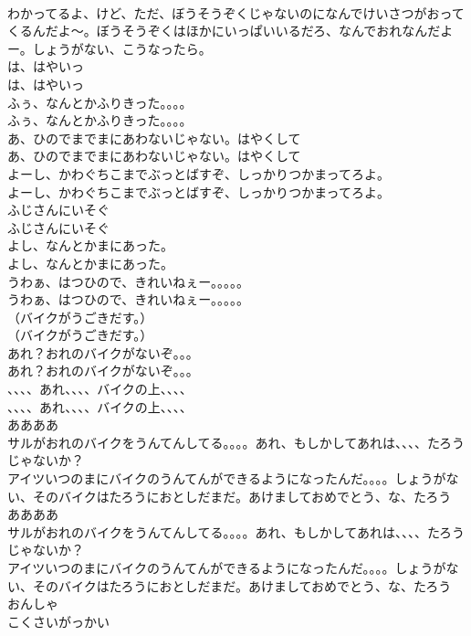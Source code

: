 \documentclass[8pt]{extreport}
\begin{document}
\begin{CJK}{UTF8}{min}
\\	わかってるよ、けど、ただ、ぼうそうぞくじゃないのになんでけいさつがおってくるんだよ〜。ぼうそうぞくはほかにいっぱいいるだろ、なんでおれなんだよー。しょうがない、こうなったら。
\\	は、はやいっ
\\	は、はやいっ
\\	ふぅ、なんとかふりきった。。。。
\\	ふぅ、なんとかふりきった。。。。
\\	あ、ひのでまでまにあわないじゃない。はやくして
\\	あ、ひのでまでまにあわないじゃない。はやくして
\\	よーし、かわぐちこまでぶっとばすぞ、しっかりつかまってろよ。
\\	よーし、かわぐちこまでぶっとばすぞ、しっかりつかまってろよ。
\\	ふじさんにいそぐ
\\	ふじさんにいそぐ
\\	よし、なんとかまにあった。
\\	よし、なんとかまにあった。
\\	うわぁ、はつひので、きれいねぇー。。。。。
\\	うわぁ、はつひので、きれいねぇー。。。。。
\\	（バイクがうごきだす。）
\\	（バイクがうごきだす。）
\\	あれ？おれのバイクがないぞ。。。
\\	あれ？おれのバイクがないぞ。。。
\\	、、、、あれ、、、、バイクの上、、、、
\\	、、、、あれ、、、、バイクの上、、、、
\\	ああああ
\\	サルがおれのバイクをうんてんしてる。。。。あれ、もしかしてあれは、、、、たろうじゃないか？
\\	アイツいつのまにバイクのうんてんができるようになったんだ。。。。しょうがない、そのバイクはたろうにおとしだまだ。あけましておめでとう、な、たろう
\\	ああああ
\\	サルがおれのバイクをうんてんしてる。。。。あれ、もしかしてあれは、、、、たろうじゃないか？
\\	アイツいつのまにバイクのうんてんができるようになったんだ。。。。しょうがない、そのバイクはたろうにおとしだまだ。あけましておめでとう、な、たろう
\\	おんしゃ
\\	こくさいがっかい

\end{CJK}
\end{document}

